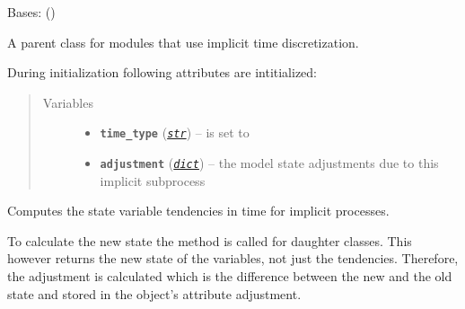 \documentclass[a4paper,10pt,english]{sphinxmanual}
\begin{document}
\begin{fulllineitems}
\label{api/climlab.process:climlab.process.implicit.ImplicitProcess}
Bases: {\hyperref[api/climlab.process:climlab.process.time_dependent_process.TimeDependentProcess]{\emph{}}} ()

A parent class for modules that use implicit time discretization.

During initialization following attributes are intitialized:
\begin{quote}\begin{description}
\item[{Variables}] \leavevmode\begin{itemize}
\item {} 
\textbf{\texttt{time\_type}} (\href{http://docs.python.org/2.7/library/functions.html\#str}{\emph{\texttt{str}}}) -- is set to 

\item {} 
\textbf{\texttt{adjustment}} (\href{http://docs.python.org/2.7/library/stdtypes.html\#dict}{\emph{\texttt{dict}}}) -- the model state adjustments due to this implicit 
subprocess

\end{itemize}

\end{description}\end{quote}

\begin{fulllineitems}
\label{api/climlab.process:climlab.process.implicit.ImplicitProcess._compute}
Computes the state variable tendencies in time for implicit processes.

To calculate the new state the  method is 
called for daughter classes. This however returns the new state of the 
variables, not just the tendencies. Therefore, the adjustment is 
calculated which is the difference between the new and the old state 
and stored in the object's attribute adjustment.


\end{fulllineitems}
\end{fulllineitems}
\end{document}
